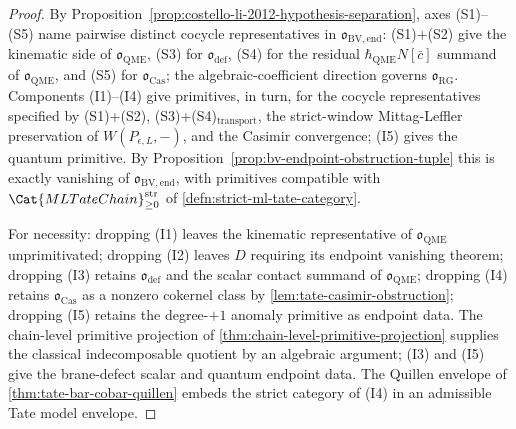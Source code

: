 \begin{proof}
  By Proposition~\ref{prop:costello-li-2012-hypothesis-separation},
  axes (S1)--(S5) name pairwise distinct cocycle representatives in
  \(\mathfrak o_{\mathrm{BV,end}}\): (S1)+(S2) give the kinematic side of
  \(\mathfrak o_{\mathrm{QME}}\), (S3) for
  \(\mathfrak o_{\mathrm{def}}\), (S4) for the residual
  \(\hbar_{\mathrm{QME}} N[\bar c]\) summand of \(\mathfrak o_{\mathrm{QME}}\), and
  (S5) for \(\mathfrak o_{\mathrm{Cas}}\); the
  algebraic-coefficient direction governs
  \(\mathfrak o_{\mathrm{RG}}\).  Components (I1)--(I4) give
  primitives, in turn, for the cocycle representatives specified by
  (S1)+(S2), (S3)+(S4)\(_{\mathrm{transport}}\), the strict-window
  Mittag-Leffler preservation of \(W(P_{\epsilon,L},-)\), and the
  Casimir convergence; (I5) gives the quantum primitive.  By
  Proposition~\ref{prop:bv-endpoint-obstruction-tuple} this is exactly
  vanishing of \(\mathfrak o_{\mathrm{BV,end}}\), with primitives
  compatible with
  \(\Cat{MLTateChain}_{\geq0}^{\mathrm{str}}\) of
  \ref{defn:strict-ml-tate-category}.

  For necessity: dropping (I1) leaves the kinematic representative of
  \(\mathfrak o_{\mathrm{QME}}\) unprimitivated; dropping (I2) leaves
  \(D\) requiring its endpoint vanishing theorem; dropping (I3) retains
  \(\mathfrak o_{\mathrm{def}}\) and the scalar contact summand of
  \(\mathfrak o_{\mathrm{QME}}\); dropping (I4) retains
  \(\mathfrak o_{\mathrm{Cas}}\) as a nonzero cokernel class by
  \ref{lem:tate-casimir-obstruction}; dropping (I5) retains the
  degree-\(+1\) anomaly primitive as endpoint data.  The chain-level
  primitive projection of \ref{thm:chain-level-primitive-projection}
  supplies the classical indecomposable quotient by an algebraic argument;
  (I3) and (I5) give the brane-defect scalar and quantum endpoint
	  data.  The Quillen envelope of
	  \ref{thm:tate-bar-cobar-quillen} embeds the strict category of
	  (I4) in an admissible Tate model envelope.
\end{proof}
